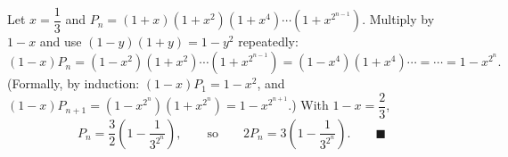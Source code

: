 Let $x=\dfrac{1}{3}$ and $P_n=(1+x)(1+x^2)(1+x^4)\cdots(1+x^{2^{n-1}})$. Multiply by $1-x$ and use $(1-y)(1+y)=1-y^2$ repeatedly:
\[
(1-x)P_n=(1-x^2)(1+x^2)\cdots(1+x^{2^{n-1}})=(1-x^4)(1+x^4)\cdots=\cdots=1-x^{2^n}.
\]
(Formally, by induction: $(1-x)P_1=1-x^2$, and $(1-x)P_{n+1}=(1-x^{2^n})(1+x^{2^n})=1-x^{2^{n+1}}$.) With $1-x=\dfrac{2}{3}$,
\[
P_n=\dfrac{3}{2}\left(1-\dfrac{1}{3^{2^n}}\right),\qquad\text{so}\qquad 2P_n=3\left(1-\dfrac{1}{3^{2^n}}\right). \qquad\blacksquare
\]
